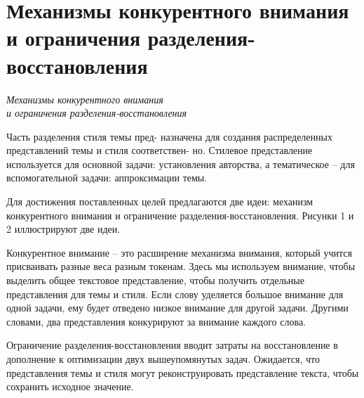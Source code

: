 \section{Механизмы конкурентного внимания\\{и ограничения разделения-восстановления}}
\begin{center}
\emph{Механизмы конкурентного внимания}\\
\emph{и ограничения разделения-восстановления}
\end{center}
\par Часть разделения стиля темы пред- назначена для создания распределенных 
представлений темы и стиля соответствен- но. Стилевое представление используется 
для основной задачи: установления авторства, а тематическое – для вспомогательной 
задачи: аппроксимации темы.
\par Для достижения поставленных целей 
предлагаются две идеи: механизм конкурентного внимания и ограничение разделения-восстановления. Рисунки 1 и 2 иллюстрируют две идеи. 
\par Конкурентное внимание – это расширение механизма внимания, который учится присваивать разные веса разным токенам. 
Здесь мы используем внимание, чтобы выделить общее текстовое представление, чтобы получить отдельные представления для темы и стиля. 
Если слову уделяется большое внимание для одной задачи, ему будет отведено низкое внимание для другой задачи. 
Другими словами, два представления конкурируют за внимание каждого слова.
\par Ограничение разделения-восстановления вводит затраты на восстановление в дополнение к оптимизации двух вышеупомянутых задач. Ожидается, что представления 
темы и стиля могут реконструировать представление текста, чтобы сохранить исходное значение.

